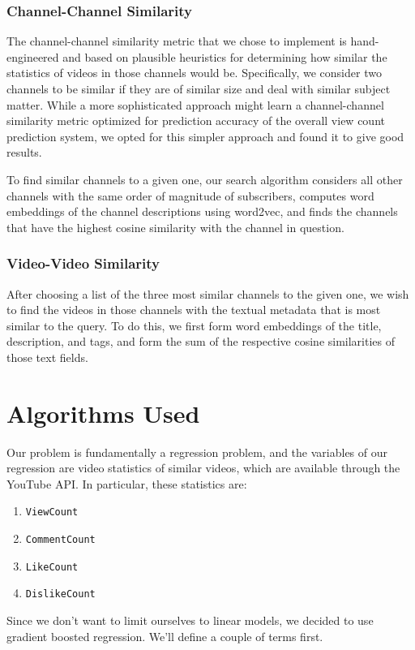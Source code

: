 \documentclass[12pt]{article}
\theoremstyle{definition}
\theoremstyle{remark}
\begin{document}
\subsubsection{Channel-Channel Similarity}
The channel-channel similarity metric that we chose to implement is
hand-engineered and based on plausible heuristics for determining how similar
the statistics of videos in those channels would be. Specifically, we consider
two channels to be similar if they are of similar size and deal with similar
subject matter. While a more sophisticated
approach might learn a channel-channel similarity metric optimized for
prediction accuracy of the overall view count prediction system, we opted for
this simpler approach and found it to give good results.

To find similar channels to a given one, our search algorithm considers all
other channels with the same order of magnitude of subscribers, computes word
embeddings of the channel descriptions using word2vec, and finds the channels that have the
highest cosine similarity with the channel in question.

\subsubsection{Video-Video Similarity}
After choosing a list of the three most similar channels to the given one, we
wish to find the videos in those channels with the textual metadata that is most
similar to the query. To do this, we first form word embeddings of the title,
description, and tags, and form the sum of the respective cosine
similarities of those text fields. 

\section{Algorithms Used}
Our problem is fundamentally a regression problem, and the variables of our
regression are video statistics of similar videos, which are
available through the
YouTube API. In particular, these statistics are:
\begin{enumerate}
  \item \texttt{ViewCount}
  \item \texttt{CommentCount}
  \item \texttt{LikeCount}
  \item \texttt{DislikeCount}
  \end{enumerate}

  Since we don't want to limit ourselves to linear models, we decided to use
  gradient boosted regression. We'll define a couple of terms first.
\end{document}
